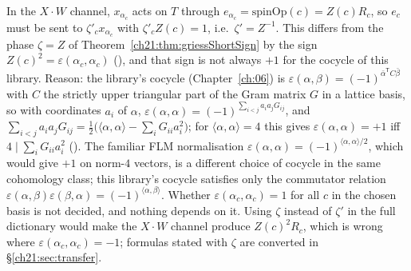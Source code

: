 \begin{warning}[title={Trap: the phases of the full dictionary are $\zeta'=Z^{-1}$, not $\zeta=Z$}]
In the $X\cdot W$ channel, $x_{\alpha_c}$ acts on $T$ through $e_{\alpha_c}=\mathrm{spinOp}(c)=Z(c)R_c$, so
$e_c$ must be sent to $\zeta'_cx_{\alpha_c}$ with $\zeta'_cZ(c)=1$, i.e.\ $\zeta'=Z^{-1}$.  This differs from
the phase $\zeta=Z$ of Theorem~\ref{ch21:thm:griessShortSign} by the sign $Z(c)^2=\varepsilon(\alpha_c,\alpha_c)$
(), and that sign is not always $+1$ for the cocycle of this library.  Reason: the
library's cocycle (Chapter~\ref{ch:06}) is $\varepsilon(\alpha,\beta)=(-1)^{\bar\alpha^{\mathsf T}C\bar\beta}$ with
$C$ the strictly upper triangular part of the Gram matrix $G$ in a lattice basis, so with coordinates $a_i$
of $\alpha$, $\varepsilon(\alpha,\alpha)=(-1)^{\sum_{i<j}a_ia_jG_{ij}}$, and
$\sum_{i<j}a_ia_jG_{ij}=\tfrac12\bigl(\langle\alpha,\alpha\rangle-\sum_iG_{ii}a_i^2\bigr)$; for
$\langle\alpha,\alpha\rangle=4$ this gives $\varepsilon(\alpha,\alpha)=+1$ iff $4\mid\sum_iG_{ii}a_i^2$
().  The familiar FLM normalisation
$\varepsilon(\alpha,\alpha)=(-1)^{\langle\alpha,\alpha\rangle/2}$, which would give $+1$ on norm-$4$ vectors, is a
different choice of cocycle in the same cohomology class; this library's cocycle satisfies only the
commutator relation $\varepsilon(\alpha,\beta)\varepsilon(\beta,\alpha)=(-1)^{\langle\alpha,\beta\rangle}$.  Whether
$\varepsilon(\alpha_c,\alpha_c)=1$ for all $c$ in the chosen basis is not decided, and nothing depends on
it.  Using $\zeta$ instead of $\zeta'$ in the full dictionary would make the $X\cdot W$ channel produce
$Z(c)^2R_c$, which is wrong where $\varepsilon(\alpha_c,\alpha_c)=-1$; formulas stated with $\zeta$ are
converted in \S\ref{ch21:sec:transfer}.
\end{warning}

